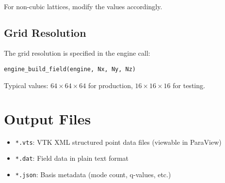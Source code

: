 For non-cubic lattices, modify the values accordingly.

\subsection{Grid Resolution}

The grid resolution is specified in the engine call:

\begin{verbatim}
engine_build_field(engine, Nx, Ny, Nz)
\end{verbatim}

Typical values: $64 \times 64 \times 64$ for production, $16 \times 16 \times 16$ for testing.

\section{Output Files}

\begin{itemize}
    \item \texttt{*.vts}: VTK XML structured point data files (viewable in ParaView)
    \item \texttt{*.dat}: Field data in plain text format
    \item \texttt{*.json}: Basis metadata (mode count, q-values, etc.)
\end{itemize}
